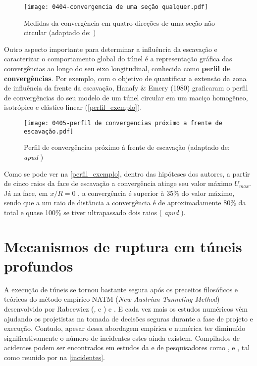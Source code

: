\begin{figure}[H]
	\begin{center}
		\texttt{[image: 0404-convergencia de uma seção qualquer.pdf]}
	\end{center}
	\caption{\label{convergenca_secao_qualquer}Medidas da convergência em quatro direções de uma seção não circular (adaptado de: )}
\end{figure}

Outro aspecto importante para determinar a influência da escavação e caracterizar o comportamento global do túnel é a representação gráfica das convergências ao longo do seu eixo longitudinal, conhecida como \textbf{perfil de convergências}. Por exemplo, com o objetivo de quantificar a extensão da zona de influência da frente da escavação, Hanafy \& Emery (1980) graficaram o perfil de convergências do seu modelo de um túnel circular em um maciço homogêneo, isotrópico e elástico linear (\autoref{perfil_exemplo}).

\begin{figure}[H]
	\begin{center}
		\texttt{[image: 0405-perfil de convergencias próximo a frente de escavação.pdf]}
	\end{center}
	\caption{\label{perfil_exemplo}Perfil de convergências próximo à frente de escavação (adaptado de:  \textit{apud} )}
\end{figure}

Como se pode ver na \autoref{perfil_exemplo}, dentro das hipóteses dos autores, a partir de cinco raios da face de escavação a convergência atinge seu valor máximo  $U_{max}$. Já na face, em $x/R=0$ , a convergência é superior à 35\% do valor máximo, sendo que a um raio de distância a convergência é de aproximadamente 80\% da total e quase 100\% se tiver ultrapassado dois raios ( \textit{apud} ).

\section{Mecanismos de ruptura em túneis profundos}

A execução de túneis se tornou bastante segura após os preceitos filosóficos e teóricos do método empírico NATM (\textit{New Austrian Tunneling Method}) desenvolvido por Rabcewicz (\citeyear{Rabcewicz1964a}, \citeyear{Rabcewicz1964b} e \citeyear{Rabcewicz1964c}) e . E cada vez mais os estudos numéricos vêm ajudando os projetistas na tomada de decisões seguras durante a fase de projeto e execução. Contudo, apesar dessa abordagem empírica e numérica ter diminuído significativamente o número de incidentes estes ainda existem. Compilados de acidentes podem ser encontrados em estudos da  e de pesquisadores como ,  e , tal como reunido por  na \autoref{incidentes}.

